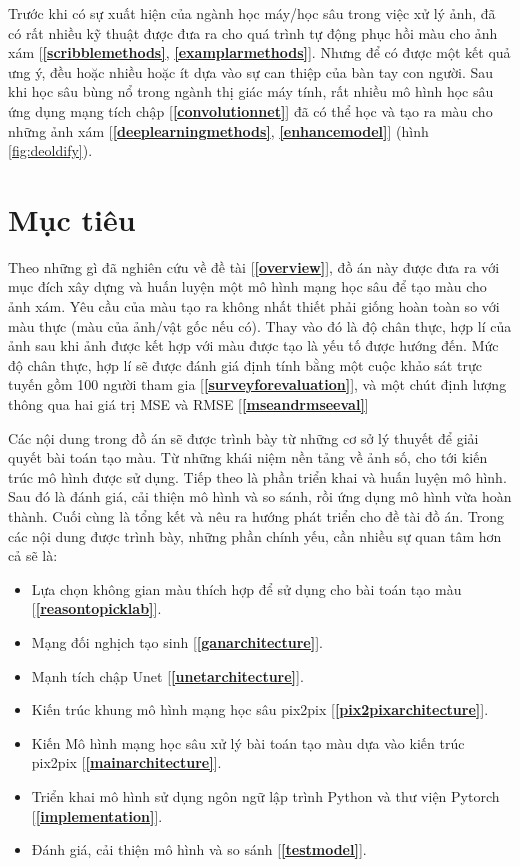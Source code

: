 \documentclass[a4paper, 12pt]{report}
\begin{document}
Trước khi có sự xuất hiện của ngành học máy/học sâu \cite{wikiml2021, wikideeplearning2021} trong việc xử lý ảnh, đã có rất nhiều kỹ thuật được đưa ra cho quá trình tự động phục hồi màu cho ảnh xám [\textbf{\ref{scribblemethods}}, \textbf{\ref{examplarmethods}}].
Nhưng để có được một kết quả ưng ý, đều hoặc nhiều hoặc ít dựa vào sự can thiệp của bàn tay con người.
Sau khi học sâu bùng nổ trong ngành thị giác máy tính, rất nhiều mô hình học sâu ứng dụng mạng tích chập [\textbf{\ref{convolutionnet}}] đã có thể học và tạo ra màu cho những ảnh xám [\textbf{\ref{deeplearningmethods}}, \textbf{\ref{enhancemodel}}] (hình \ref{fig:deoldify}).

\section{Mục tiêu}\label{objective}

Theo những gì đã nghiên cứu về đề tài [\textbf{\ref{overview}}], đồ án này được đưa ra với mục đích xây dựng và huấn luyện một mô hình mạng học sâu để tạo màu cho ảnh xám.
Yêu cầu của màu tạo ra không nhất thiết phải giống hoàn toàn so với màu thực (màu của ảnh/vật gốc nếu có).
Thay vào đó là độ chân thực, hợp lí của ảnh sau khi ảnh được kết hợp với màu được tạo là yếu tố được hướng đến.
Mức độ chân thực, hợp lí sẽ được đánh giá định tính bằng một cuộc khảo sát trực tuyến gồm 100 người tham gia [\textbf{\ref{surveyforevaluation}}], và một chút định lượng thông qua hai giá trị MSE và RMSE [\textbf{\ref{mseandrmseeval}}]\vspace{5pt}

Các nội dung trong đồ án sẽ được trình bày từ những cơ sở lý thuyết để giải quyết bài toán tạo màu.
Từ những khái niệm nền tảng về ảnh số, cho tới kiến trúc mô hình được sử dụng.
Tiếp theo là phần triển khai và huấn luyện mô hình.
Sau đó là đánh giá, cải thiện mô hình và so sánh, rồi ứng dụng mô hình vừa hoàn thành.
Cuối cùng là tổng kết và nêu ra hướng phát triển cho đề tài đồ án.
Trong các nội dung được trình bày, những phần chính yếu, cần nhiều sự quan tâm hơn cả sẽ là:

\begin{itemize}
    \item Lựa chọn không gian màu thích hợp để sử dụng cho bài toán tạo màu [\textbf{\ref{reasontopicklab}}].
    \item Mạng đối nghịch tạo sinh [\textbf{\ref{ganarchitecture}}].
    \item Mạnh tích chập Unet [\textbf{\ref{unetarchitecture}}].
    \item Kiến trúc khung mô hình mạng học sâu pix2pix [\textbf{\ref{pix2pixarchitecture}}].
    \item Kiến Mô hình mạng học sâu xử lý bài toán tạo màu dựa vào kiến trúc pix2pix [\textbf{\ref{mainarchitecture}}].
    \item Triển khai mô hình sử dụng ngôn ngữ lập trình Python và thư viện Pytorch [\textbf{\ref{implementation}}].
    \item Đánh giá, cải thiện mô hình và so sánh [\textbf{\ref{testmodel}}].
\end{itemize}
\end{document}
